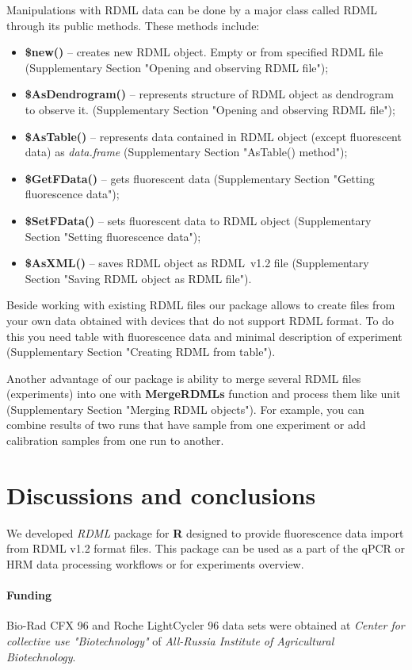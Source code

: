 \documentclass{bioinfo}
\begin{document}
Manipulations with RDML data can be done by a major class called RDML through its public methods. 
These methods include:
\begin{itemize}
	\item \textbf{\$new()} -- creates new RDML object. Empty or from specified RDML file (Supplementary Section "Opening and observing RDML file");
	\item \textbf{\$AsDendrogram()} -- represents structure of RDML object as dendrogram to observe it. (Supplementary Section "Opening and observing RDML file");	
	\item \textbf{\$AsTable()} -- represents data contained in RDML object (except fluorescent data) as \textit{data.frame} (Supplementary Section "AsTable() method");
	\item \textbf{\$GetFData()} -- gets fluorescent data (Supplementary Section "Getting fluorescence data");
	\item \textbf{\$SetFData()} -- sets fluorescent data to RDML object (Supplementary Section "Setting fluorescence data");
	\item \textbf{\$AsXML()} -- saves RDML object as RDML~v1.2 file (Supplementary Section "Saving RDML object as RDML file").
\end{itemize}

Beside working with existing RDML files our package allows to create files from your own data obtained with devices that do not support RDML format. To do this you need table with fluorescence data and minimal description of experiment (Supplementary Section "Creating RDML from table").

Another advantage of our package is ability to merge several RDML files (experiments) into one with \textbf{MergeRDMLs} function and process them like unit (Supplementary Section "Merging RDML objects"). For example, you can combine results of two runs that have sample from one experiment or add calibration samples from one run to another.

\section{Discussions and conclusions}

We developed \textit{RDML} package for \textbf{R} designed to provide fluorescence data import from RDML v1.2 format files. This package can be used as a part of the qPCR or HRM data processing workflows or for experiments overview.

\paragraph{Funding\textcolon}  Bio-Rad CFX 96 and Roche LightCycler 96 data sets were obtained at \textit{Center for collective use "Biotechnology"} of \textit{All-Russia Institute of Agricultural Biotechnology}.

%
%
%
%
%
%

%

\end{document}
